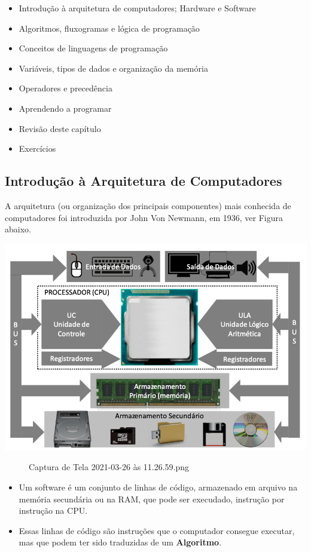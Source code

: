 \documentclass[12pt,a4paper]{article}
\providecommand{\tightlist}{%
      \setlength{\itemsep}{0pt}\setlength{\parskip}{0pt}}
\begin{document}
\begin{itemize}
\tightlist
\item
  Introdução à arquitetura de computadores; Hardware e Software
\item
  Algoritmos, fluxogramas e lógica de programação
\item
  Conceitos de linguagens de programação
\item
  Variáveis, tipos de dados e organização da memória
\item
  Operadores e precedência
\item
  Aprendendo a programar
\item
  Revisão deste capítulo
\item
  Exercícios
\end{itemize}

    \hypertarget{introduuxe7uxe3o-uxe0-arquitetura-de-computadores}{%
\subsection{Introdução à Arquitetura de
Computadores}\label{introduuxe7uxe3o-uxe0-arquitetura-de-computadores}}

    A arquitetura (ou organização dos principais componentes) mais conhecida
de computadores foi introduzida por John Von Newmann, em 1936, ver
Figura abaixo.

\includegraphics{"figs/image02.png"}

    \begin{figure}
\centering
\caption{Captura de Tela 2021-03-26 às 11.26.59.png}
\end{figure}

    \begin{itemize}
\item
  Um software é um conjunto de linhas de código, armazenado em arquivo
  na memória secundária ou na RAM, que pode ser execudado, instrução por
  instrução na CPU.
\item
  Essas linhas de código são instruções que o computador consegue
  executar, mas que podem ter sido traduzidas de um \textbf{Algoritmo}.
\end{itemize}
\end{document}
